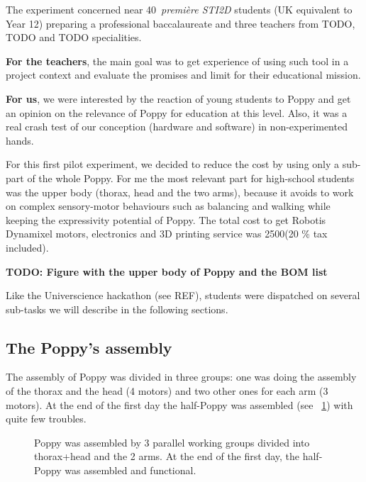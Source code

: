 The experiment concerned near 40~\emph{première STI2D} students (UK equivalent to Year 12) preparing a professional baccalaureate and three teachers from TODO, TODO and TODO specialities.

\textbf{For the teachers}, the main goal was to get experience of using such tool in a project context and evaluate the promises and limit for their educational mission.

\textbf{For us}, we were interested by the reaction of young students to Poppy and get an opinion on the relevance of Poppy for education at this level. Also, it was a real crash test of our conception (hardware and software) in non-experimented hands.

For this first pilot experiment, we decided to reduce the cost by using only a sub-part of the whole Poppy. For me the most relevant part for high-school students was the upper body (thorax, head and the two arms), because it avoids to work on complex sensory-motor behaviours such as balancing and walking while keeping the expressivity potential of Poppy. The total cost to get Robotis Dynamixel motors, electronics and 3D printing service was 2500\texteuro (20 \% tax included).

\textbf{TODO: Figure with the upper body of Poppy and the BOM list}

Like the Universcience hackathon (see REF), students were dispatched on several sub-tasks we will describe in the following sections.


\subsection{The Poppy's assembly} %

The assembly of Poppy was divided in three groups: one was doing the assembly of the thorax and the head (4 motors) and two other ones for each arm (3 motors). At the end of the first day the half-Poppy was assembled (see \figurename~\ref{fig:saintonge_assembly}) with quite few troubles.

\begin{figure}[h!]
\centering
    \hfil
    \hfil
    \hfil
    \caption{Poppy was assembled by 3 parallel working groups divided into thorax+head and the 2 arms. At the end of the first day, the half-Poppy was assembled and functional. }
    \label{fig:saintonge_assembly}
\end{figure}

